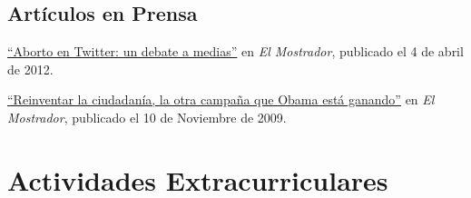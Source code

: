 \documentclass[letterpaper, 12pt]{article}
\renewenvironment{itemize}{
  \begin{list}{}{
    \setlength{\leftmargin}{0.45cm}
  }
}{
  \end{list}
}
\begin{document}
\subsection*{Artículos en Prensa}

\begin{itemize}
\item \href{http://www.elmostrador.cl/opinion/2012/04/04/aborto-en-twitter-un-debate-a-medias/}{``Aborto en Twitter: un debate a medias''} en {\it El Mostrador}, publicado el 4 de abril de 2012.
\item \href{http://www.uai.cl/200911165701/columna-de-opinion/columnas-opinion/reinventar-la-ciudadania-la-otra-campana-que-obama-esta-ganando}{``Reinventar la ciudadanía, la otra campaña que Obama está ganando''} en {\it El Mostrador}, publicado el 10 de Noviembre de 2009.
\end{itemize}

\section*{Actividades Extracurriculares}
\end{document}
